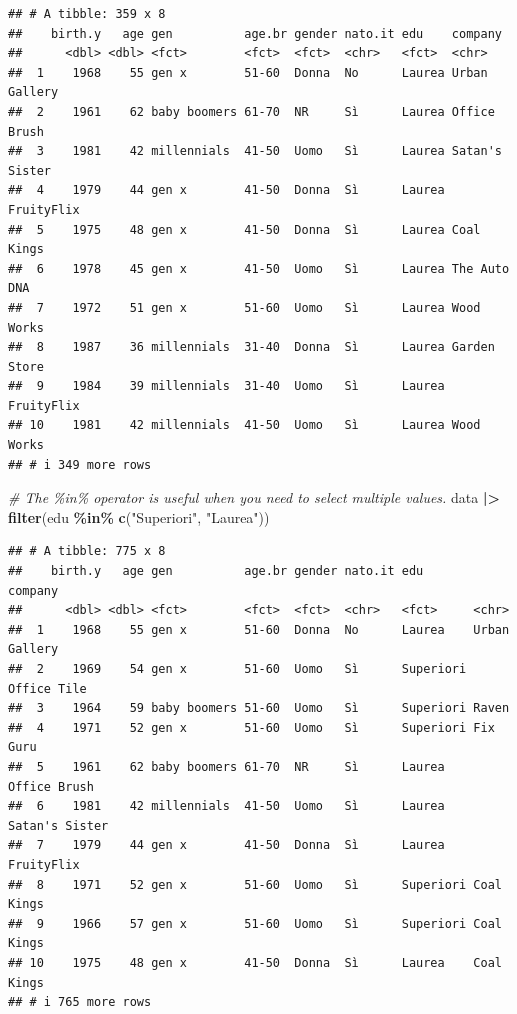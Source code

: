 \documentclass[
]{book}
\newenvironment{Shaded}{\begin{snugshade}}{\end{snugshade}}
\newcommand{\CommentTok}[1]{\textcolor[rgb]{0.56,0.35,0.01}{\textit{#1}}}
\newcommand{\FunctionTok}[1]{\textcolor[rgb]{0.13,0.29,0.53}{\textbf{#1}}}
\newcommand{\NormalTok}[1]{#1}
\newcommand{\SpecialCharTok}[1]{\textcolor[rgb]{0.81,0.36,0.00}{\textbf{#1}}}
\newcommand{\StringTok}[1]{\textcolor[rgb]{0.31,0.60,0.02}{#1}}
\begin{document}
\begin{verbatim}
## # A tibble: 359 x 8
##    birth.y   age gen          age.br gender nato.it edu    company       
##      <dbl> <dbl> <fct>        <fct>  <fct>  <chr>   <fct>  <chr>         
##  1    1968    55 gen x        51-60  Donna  No      Laurea Urban Gallery 
##  2    1961    62 baby boomers 61-70  NR     Sì      Laurea Office Brush  
##  3    1981    42 millennials  41-50  Uomo   Sì      Laurea Satan's Sister
##  4    1979    44 gen x        41-50  Donna  Sì      Laurea FruityFlix    
##  5    1975    48 gen x        41-50  Donna  Sì      Laurea Coal Kings    
##  6    1978    45 gen x        41-50  Uomo   Sì      Laurea The Auto DNA  
##  7    1972    51 gen x        51-60  Uomo   Sì      Laurea Wood Works    
##  8    1987    36 millennials  31-40  Donna  Sì      Laurea Garden Store  
##  9    1984    39 millennials  31-40  Uomo   Sì      Laurea FruityFlix    
## 10    1981    42 millennials  41-50  Uomo   Sì      Laurea Wood Works    
## # i 349 more rows
\end{verbatim}

\begin{Shaded}
\begin{Highlighting}[]
\CommentTok{\# The \%in\% operator is useful when you need to select multiple values.}
\NormalTok{data }\SpecialCharTok{|\textgreater{}} 
  \FunctionTok{filter}\NormalTok{(edu }\SpecialCharTok{\%in\%} \FunctionTok{c}\NormalTok{(}\StringTok{"Superiori"}\NormalTok{, }\StringTok{"Laurea"}\NormalTok{))}
\end{Highlighting}
\end{Shaded}

\begin{verbatim}
## # A tibble: 775 x 8
##    birth.y   age gen          age.br gender nato.it edu       company       
##      <dbl> <dbl> <fct>        <fct>  <fct>  <chr>   <fct>     <chr>         
##  1    1968    55 gen x        51-60  Donna  No      Laurea    Urban Gallery 
##  2    1969    54 gen x        51-60  Uomo   Sì      Superiori Office Tile   
##  3    1964    59 baby boomers 51-60  Uomo   Sì      Superiori Raven         
##  4    1971    52 gen x        51-60  Uomo   Sì      Superiori Fix Guru      
##  5    1961    62 baby boomers 61-70  NR     Sì      Laurea    Office Brush  
##  6    1981    42 millennials  41-50  Uomo   Sì      Laurea    Satan's Sister
##  7    1979    44 gen x        41-50  Donna  Sì      Laurea    FruityFlix    
##  8    1971    52 gen x        51-60  Uomo   Sì      Superiori Coal Kings    
##  9    1966    57 gen x        51-60  Uomo   Sì      Superiori Coal Kings    
## 10    1975    48 gen x        41-50  Donna  Sì      Laurea    Coal Kings    
## # i 765 more rows
\end{verbatim}
\end{document}
